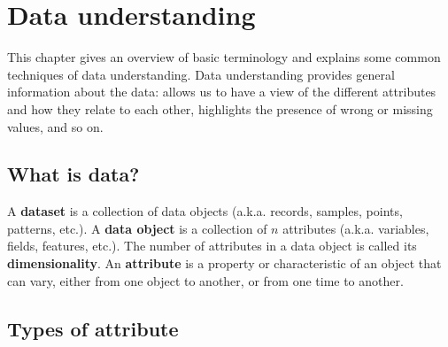 \chapter{Data understanding}
This chapter gives an overview of basic terminology and explains some common techniques of data understanding. Data understanding provides general information about the data: allows us to have a view of the different attributes and how they relate to each other, highlights the presence of wrong or missing values, and so on.

\section{What is data?}

A \textbf{dataset} is a collection of data objects (a.k.a. records, samples, points, patterns, etc.).
A \textbf{data object} is a collection of $n$ attributes (a.k.a. variables, fields, features, etc.). The number of attributes in a data object is called its \textbf{dimensionality}.
An \textbf{attribute} is a property or characteristic of an object that can vary, either from one object to another, or from one time to another. 

\section{Types of attribute}



